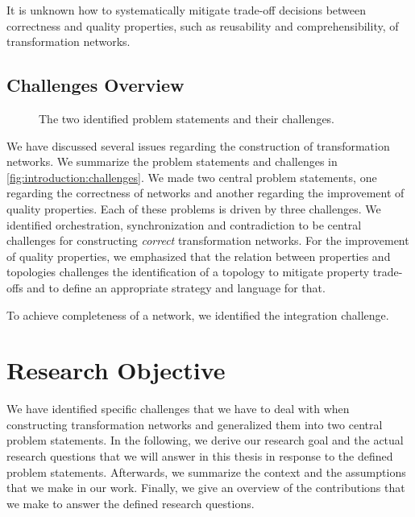 \begin{problemstatement}
    It is unknown how to systematically mitigate trade-off decisions between correctness and quality properties, such as reusability and comprehensibility, of transformation networks.
\end{problemstatement}


\subsection{Challenges Overview}

\begin{figure}
    \centering
    
    \caption[Problem statements and challenges]{The two identified problem statements and their challenges.}
    \label{fig:introduction:challenges}
\end{figure}

We have discussed several issues regarding the construction of transformation networks.
We summarize the problem statements and challenges in \autoref{fig:introduction:challenges}.
We made two central problem statements, one regarding the correctness of networks and another regarding the improvement of quality properties.
Each of these problems is driven by three challenges.
We identified orchestration, synchronization and contradiction to be central challenges for constructing \emph{correct} transformation networks.
For the improvement of quality properties, we emphasized that the relation between properties and topologies challenges the identification of a topology to mitigate property trade-offs and to define an appropriate strategy and language for that.
\begin{integrationcontribution}
To achieve completeness of a network, we identified the integration challenge. %
\end{integrationcontribution}


\section{Research Objective}

We have identified specific challenges that we have to deal with when constructing transformation networks and generalized them into two central problem statements.
In the following, we derive our research goal and the actual research questions that we will answer in this thesis in response to the defined problem statements.
Afterwards, we summarize the context and the assumptions that we make in our work.
Finally, we give an overview of the contributions that we make to answer the defined research questions.

